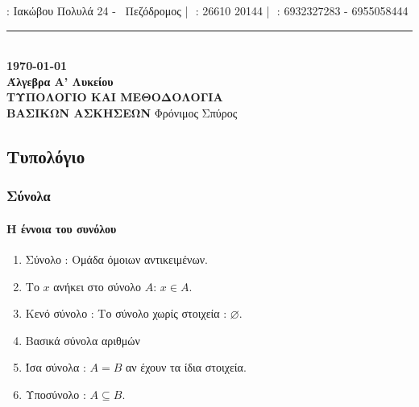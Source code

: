 \documentclass[a4paper,11pt]{article}
\begin{document}
\begin{center}
\vspace{-1mm}
{} : Ιακώβου Πολυλά 24 - \ Πεζόδρομος\,\,|\,\,{} : 26610 20144\,\,|\,\, {} : 6932327283 - 6955058444\\
\rule{14.7cm}{.1mm}\\
\vspace{2mm}
{\bf\today}\\
\vspace{3cm}
{\Huge \textbf{Άλγεβρα Α' Λυκείου}}\\
\vspace*{3cm}
{{\LARGE }\textbf{ΤΥΠΟΛΟΓΙΟ ΚΑΙ ΜΕΘΟΔΟΛΟΓΙΑ}\\[2mm]\textbf{ΒΑΣΙΚΩΝ ΑΣΚΗΣΕΩΝ}}
\vspace*{\fill}
\vfil
Φρόνιμος Σπύρος
\end{center}
\newpage
\null
\newpage
{}
\begin{center}
\part{Τυπολόγιο}
\end{center}
\section{Σύνολα}
\subsection{Η έννοια του συνόλου}
\begin{enumerate}[label=\thesection.\arabic*]
\item Σύνολο : Ομάδα όμοιων αντικειμένων.
\item Το $ x $ ανήκει στο σύνολο $ A $: $ x\in A $.
\item Κενό σύνολο : Το σύνολο χωρίς στοιχεία : $ \varnothing $.
\item Βασικά σύνολα αριθμών
\item Ίσα σύνολα : $ A=B $ αν έχουν τα ίδια στοιχεία. 
\item Υποσύνολο : $ A\subseteq B $.
\end{enumerate}
\end{document}

